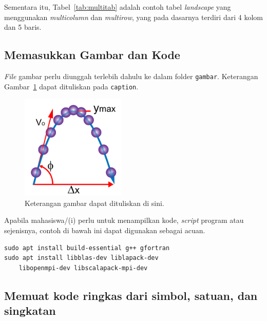 Sementara itu, Tabel~\ref{tab:multitab} adalah contoh tabel \textit{landscape} yang menggunakan \textit{multicolumn} dan \textit{multirow}, yang pada dasarnya terdiri dari 4 kolom dan 5 baris.

\newpage %
\subsection{Memasukkan Gambar dan Kode}

\textit{File} gambar perlu diunggah terlebih dahulu ke dalam folder \texttt{gambar}. Keterangan Gambar~\ref{fig:gambar1} dapat dituliskan pada \texttt{caption}.

\begin{figure}[h] %
    \centering
    \includegraphics[width=5cm]{./gambar/contoh.png}
    \caption{Keterangan gambar dapat dituliskan di sini.}
    \label{fig:gambar1}
\end{figure}

Apabila mahasiswa/(i) perlu untuk menampilkan kode, \textit{script} program atau sejenisnya, contoh di bawah ini dapat digunakan sebagai acuan.

{\color{blue}
\begin{lstlisting}
sudo apt install build-essential g++ gfortran 
sudo apt install libblas-dev liblapack-dev 
    libopenmpi-dev libscalapack-mpi-dev 
\end{lstlisting}
}


\subsection{Memuat kode ringkas dari simbol, satuan, dan singkatan}

